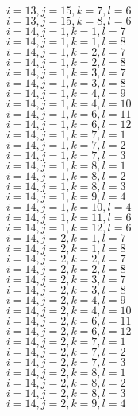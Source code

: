 \documentclass[14pt]{article}
\begin{document}
    $i=13,j=15,k=7,l=6 $ \\ 
    $i=13,j=15,k=8,l=6 $ \\ 
    $i=14,j=1,k=1,l=7 $ \\ 
    $i=14,j=1,k=1,l=8 $ \\ 
    $i=14,j=1,k=2,l=7 $ \\ 
    $i=14,j=1,k=2,l=8 $ \\ 
    $i=14,j=1,k=3,l=7 $ \\ 
    $i=14,j=1,k=3,l=8 $ \\ 
    $i=14,j=1,k=4,l=9 $ \\ 
    $i=14,j=1,k=4,l=10 $ \\ 
    $i=14,j=1,k=6,l=11 $ \\ 
    $i=14,j=1,k=6,l=12 $ \\ 
    $i=14,j=1,k=7,l=1 $ \\ 
    $i=14,j=1,k=7,l=2 $ \\ 
    $i=14,j=1,k=7,l=3 $ \\ 
    $i=14,j=1,k=8,l=1 $ \\ 
    $i=14,j=1,k=8,l=2 $ \\ 
    $i=14,j=1,k=8,l=3 $ \\ 
    $i=14,j=1,k=9,l=4 $ \\ 
    $i=14,j=1,k=10,l=4 $ \\ 
    $i=14,j=1,k=11,l=6 $ \\ 
    $i=14,j=1,k=12,l=6 $ \\ 
    $i=14,j=2,k=1,l=7 $ \\ 
    $i=14,j=2,k=1,l=8 $ \\ 
    $i=14,j=2,k=2,l=7 $ \\ 
    $i=14,j=2,k=2,l=8 $ \\ 
    $i=14,j=2,k=3,l=7 $ \\ 
    $i=14,j=2,k=3,l=8 $ \\ 
    $i=14,j=2,k=4,l=9 $ \\ 
    $i=14,j=2,k=4,l=10 $ \\ 
    $i=14,j=2,k=6,l=11 $ \\ 
    $i=14,j=2,k=6,l=12 $ \\ 
    $i=14,j=2,k=7,l=1 $ \\ 
    $i=14,j=2,k=7,l=2 $ \\ 
    $i=14,j=2,k=7,l=3 $ \\ 
    $i=14,j=2,k=8,l=1 $ \\ 
    $i=14,j=2,k=8,l=2 $ \\ 
    $i=14,j=2,k=8,l=3 $ \\ 
    $i=14,j=2,k=9,l=4 $ \\ 
\end{document}
